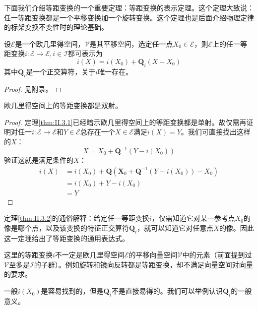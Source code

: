 \documentclass[main.tex]{subfiles}
\begin{document}
下面我们介绍等距变换的一个重要定理：等距变换的表示定理。这个定理大致说：任一等距变换都是一个平移变换加一个旋转变换。这个定理也是后面介绍物理定律的标架变换不变性时的理论基础。

\begin{theorem}[等距变换的表示定理]\label{thm:II.3.2}
    设$\mathcal{E}$是一个欧几里得空间，$\mathcal{V}$是其平移空间，选定任一点$X_0\in\mathcal{E}$，则$\mathcal{E}$上的任一等距变换$i:\mathcal{E}\rightarrow\mathcal{E},i\in\mathcal{I}$都可表示为
    \[
        i\left(X\right)=i\left(X_0\right)+\mathbf{Q}_i\left(X-X_0\right)
    \]
    其中$\mathbf{Q}_i$是一个正交算符，关于$i$唯一存在。
\end{theorem}
\begin{proof}
    见附录。
\end{proof}

\begin{corollary}
    欧几里得空间上的等距变换都是双射。
\end{corollary}
\begin{proof}
    定理\ref{thm:II.3.1}已经暗示欧几里得空间上的等距变换都是单射。故仅需再证明对任一$i:
        \mathcal{E}\rightarrow\mathcal{E}$和$Y\in\mathcal{E}$总存在一个$X\in\mathcal{E}$满足$i\left(X\right)=Y$。我们可直接找出这样的$X$：
    \[
        X=X_0+\mathbf{Q}^{-1}\left(Y-i\left(X_0\right)\right)
    \]
    验证这就是满足条件的$X$：
    \begin{align*}
        i\left(X\right) & =i\left(X_0\right)+\mathbf{Q}\left(\mathbf{X}_0+\mathbf{Q}^{-1}\left(Y-i\left(X_0\right)\right)-X_0\right) \\
                        & =i\left(X_0\right)+Y-i\left(X_0\right)                                                                     \\
                        & =Y
    \end{align*}
\end{proof}

定理\ref{thm:II.3.2}的通俗解释：给定任一等距变换$i$，仅需知道它对某一参考点$X_0$的像是哪个点，以及该变换的特征正交算符$\mathbf{Q}_i$，就可以知道它对任意点$X$的像。因此这一定理给出了等距变换的通用表达式。

这里的等距变换$i$不一定是欧几里得空间$\mathcal{E}$的平移向量空间$\mathcal{V}$中的元素（前面提到过$\mathcal{V}$至多是$\mathcal{I}$的子群）。例如旋转和镜向反转都是等距变换，却不满足向量空间对向量的要求。

一般$i\left(X_0\right)$是容易找到的，但是$\mathbf{Q}_i$不是直接易得的。我们可以举例认识$\mathbf{Q}_i$的一般意义。
\end{document}
